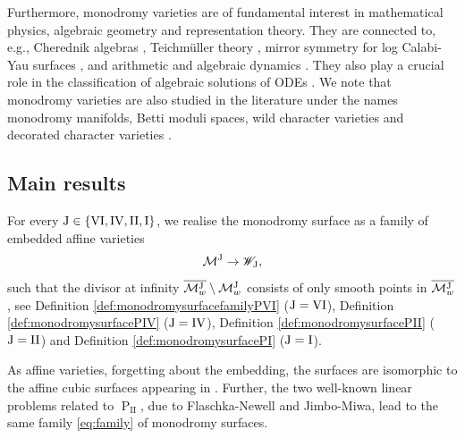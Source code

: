 \documentclass[a4paper,reqno]{amsart}
\numberwithin{equation}{section}
\newcommand{\pain}[1]{\operatorname{P}_{\mathrm{#1}}}
\numberwithin{equation}{section}
\begin{document}
Furthermore, monodromy varieties are of fundamental interest in mathematical physics, algebraic geometry and representation theory.
They are connected to, e.g., 
Cherednik algebras \cites{oblomkovDAHA,oblomkov, mazzoccoconfluences,chekhovconj}, Teichm\"uller theory \cite{chekhovmazzocco}, mirror symmetry for log Calabi-Yau surfaces \cites{grosshackingkeel,quantummirror,mirrorsymmetryforpainleve}, and arithmetic and algebraic dynamics \cites{CantatLoray,Cantat,rebeloroeder1,rebeloroeder2}.
They also play a crucial role in the classification of algebraic solutions of ODEs \cites{dubrovinmazzocco,mazzocco2001,boalchschwarzlist,boalchicosahedral,hitchinponcelet,litt}.
We note that monodromy varieties are  also studied in the literature under the names monodromy manifolds, Betti moduli spaces, wild character varieties and decorated character varieties \cites{putsaito, benedettadecoratedlocalsystems,boalchgeometryandbraiding,chekhovdecorated}.


\subsection{Main results}
For every $\rm{J}\in\{\rm{VI},\rm{IV},\rm{II},\rm{I}\}$,
we realise the monodromy surface as a family of embedded affine varieties
\begin{equation}\label{eq:family}
    \mathcal{M}^{\rm{J}} \to \mathscr{W}_{\rm{J}},
\end{equation} 
such that the divisor at infinity $\overline{\mathcal{M}^{\rm{J}}_w}\setminus \mathcal{M}^{\rm{J}}_w$ consists of only smooth points in $\overline{\mathcal{M}^{\rm{J}}_w}$, see Definition \ref{def:monodromysurfacefamilyPVI} ($\rm{J}=\rm{VI}$), Definition \ref{def:monodromysurfacePIV} ($\rm{J}=\rm{IV}$),
Definition \ref{def:monodromysurfacePII} ($\rm{J}=\rm{II}$) and
Definition \ref{def:monodromysurfacePI} ($\rm{J}=\rm{I}$).

As affine varieties, forgetting about the embedding, the surfaces are isomorphic to the affine cubic surfaces appearing in \cites{putsaito,chekhovdecorated}. 
Further, the two well-known linear problems related to $\pain{II}$, due to Flaschka-Newell and Jimbo-Miwa, lead to the same family \eqref{eq:family} of monodromy surfaces.
\end{document}
